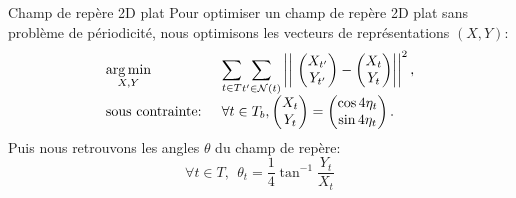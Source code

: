 \begin{frame}{Champ de repère 2D plat}
    \small
    Pour optimiser un champ de repère 2D plat sans problème de périodicité, nous optimisons 
    les vecteurs de représentations $(X, Y)$:
    \small{
    \begin{equation*}
    \begin{array}{ll}
    \underset{X, Y}{\argmin} & \underset{t \in T}{\displaystyle\sum} \underset{t' \in \mathcal{N}(t)}{\displaystyle\sum} \left|\left|\ \begin{pmatrix} X_{t'}\\ Y_{t'}\end{pmatrix} - \begin{pmatrix} X_{t}\\ Y_{t}\end{pmatrix} \right|\right|^2, \\
    \text{sous contrainte: } & \forall t \in T_b, \begin{pmatrix} X_{t}\\ Y_{t}\end{pmatrix} = \begin{pmatrix} \cos4\eta_t\\ \sin4\eta_t\end{pmatrix}.
    \end{array}
    \end{equation*}
    }
    Puis nous retrouvons les angles $\theta$ du champ de repère:
    $$ \forall t \in T,\ \  \theta_t = \frac{1}{4}\tan^{-1}\frac{Y_t}{X_t}$$

\end{frame}
\iffalse

